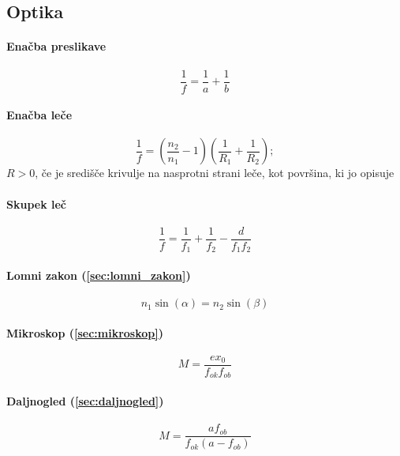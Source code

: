\documentclass[a4paper,12pt]{article}
\begin{document}
\subsection{Optika}
\begin{multicols}{2}
    \paragraph{Enačba preslikave}
    \begin{equation}
        \frac{1}{f} = \frac{1}{a} + \frac{1}{b}
    \end{equation}

    \paragraph{Enačba leče}
    \begin{equation}
        \frac{1}{f} = (\frac{n_2}{n_1} - 1) ( \frac{1}{R_1} + \frac{1}{R_2} );
    \end{equation}
    $R > 0$, če je središče krivulje na nasprotni strani leče, kot površina, ki jo opisuje

    \paragraph{Skupek leč}
    \begin{equation}
        \frac{1}{f} = \frac{1}{f_1} + \frac{1}{f_2} - \frac{d}{f_1f_2}
    \end{equation}

    \paragraph{Lomni zakon (\ref{sec:lomni_zakon})}
    \begin{equation}
        n_1 \sin(\alpha) = n_2 \sin(\beta)
    \end{equation}

    \paragraph{Mikroskop (\ref{sec:mikroskop})}
    \begin{equation}
        M = \frac{e x_0}{f_{ok} f_{ob}}
    \end{equation}

    \paragraph{Daljnogled (\ref{sec:daljnogled})}
    \begin{equation}
        M = \frac{a f_{ob}}{f_{ok} (a - f_{ob})}
    \end{equation}
\end{multicols}
\end{document}

